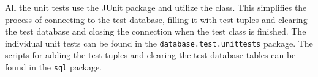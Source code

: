 All the unit tests use the JUnit package and utilize the  class. This simplifies the process of connecting to the test database, filling it with test tuples and clearing the test database and closing the connection when the test class is finished. The individual unit tests can be found in the \texttt{database.test.unittests} package. The scripts for adding the test tuples and clearing the test database tables can be found in the \texttt{sql} package.